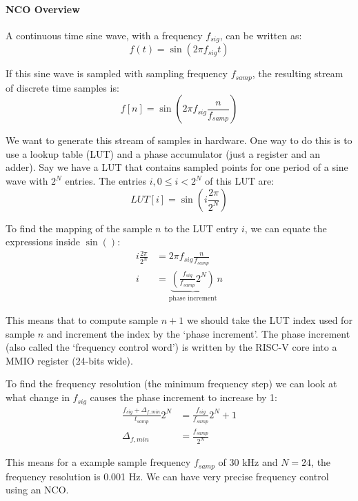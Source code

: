 \documentclass[11pt]{article}
\begin{document}
\paragraph{NCO Overview}
A continuous time sine wave, with a frequency $f_{sig}$, can be written as:
\begin{equation*}
  f(t) = \sin \left( 2 \pi f_{sig} t \right)
\end{equation*}

If this sine wave is sampled with sampling frequency $f_{samp}$, the resulting stream of discrete time samples is:
\begin{equation*}
  f[n] = \sin \left( 2 \pi f_{sig} \frac{n}{f_{samp}} \right)
\end{equation*}

We want to generate this stream of samples in hardware.
One way to do this is to use a lookup table (LUT) and a phase accumulator (just a register and an adder).
Say we have a LUT that contains sampled points for one period of a sine wave with $2^N$ entries.
The entries $i, 0 \leq i < 2^N$ of this LUT are:
\begin{equation*}
  LUT[i] = \sin \left( i \frac{2 \pi}{2^N} \right)
\end{equation*}

To find the mapping of the sample $n$ to the LUT entry $i$, we can equate the expressions inside $\sin()$:
\begin{align*}
  i \frac{2 \pi}{2^N} &= 2 \pi f_{sig} \frac{n}{f_{samp}} \\
  i &= \underbrace{\left( \frac{f_{sig}}{f_{samp}} 2^N \right)}_{\text{phase increment}} n
\end{align*}

This means that to compute sample $n+1$ we should take the LUT index used for sample $n$ and increment the index by the `phase increment'.
The phase increment (also called the `frequency control word') is written by the RISC-V core into a MMIO register (24-bits wide).

To find the frequency resolution (the minimum frequency step) we can look at what change in $f_{sig}$ causes the phase increment to increase by 1:
\begin{align*}
  \frac{f_{sig} + \Delta_{f,min}}{t_{samp}} 2^N &= \frac{f_{sig}}{f_{samp}} 2^N + 1 \\
  \Delta_{f,min} &= \frac{f_{samp}}{2^N}
\end{align*}

This means for a example sample frequency $f_{samp}$ of 30 kHz and $N = 24$, the frequency resolution is 0.001 Hz.
We can have very precise frequency control using an NCO.
\end{document}
